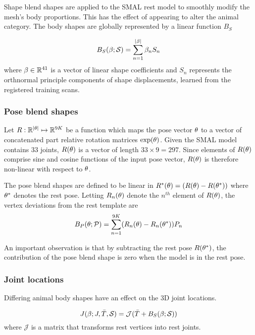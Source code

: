 Shape blend shapes are applied to the SMAL rest model to smoothly modify the mesh's body proportions. This has the effect of appearing to alter the animal category. The body shapes are globally represented by a linear function $B_{S}$

\begin{equation}\label{eqt:shapeblendshapes}
    B_{S}(\beta;\mathcal{S}) = \sum_{n=1}^{|\beta|}\beta_{n}S_{n}
\end{equation}
where $\beta \in {\mathbb{R}^{41}}$ is a vector of linear shape coefficients and $S_{n}$ represents the orthnormal principle components of shape displacements, learned from the registered training scans. 


\subsubsection{Pose blend shapes}

Let $R: {\mathbb{R}^{|\theta|}} \mapsto {\mathbb{R}^{9K}}$ be a function which maps the pose vector $\theta$ to a vector of concatenated part relative rotation matrices $\exp(\theta)$. Given the SMAL model contains $33$ joints, $R(\theta)$ is a vector of length $33 \times 9 = 297$. Since elements of $R(\theta)$ comprise sine and cosine functions of the input pose vector, $R(\theta)$ is therefore non-linear with respect to $\theta$.

The pose blend shapes are defined to be linear in $R^{*}(\theta) = (R(\theta) - R(\theta^{*}))$ where $\theta^{*}$ denotes the rest pose. Letting $R_{n}(\theta)$ denote the $n^{th}$ element of $R(\theta)$, the vertex deviations from the rest template are
\begin{equation}
    B_{P}(\theta;\mathcal{P}) = \sum_{n=1}^{9K} (R_{n}(\theta) - R_{n}(\theta^{*}))P_{n}
\end{equation}

An important observation is that by subtracting the rest pose $R(\theta^{*})$, the contribution of the pose blend shape is zero when the model is in the rest pose.

\subsubsection{Joint locations}

Differing animal body shapes have an effect on the 3D joint locations. 

\begin{equation}
    J(\beta; J, \bar{T}, \mathcal{S}) = \mathcal{J}(\bar{T} + B_{S}(\beta; \mathcal{S}))
\end{equation}\label{eq:smpl_joint_locations}
where $\mathcal{J}$ is a matrix that transforms rest vertices into rest joints.

